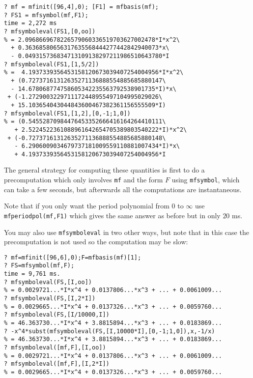 \documentclass[11pt]{article}
\def\kbd#1{{\tt #1}}
\begin{document}
\begin{verbatim}
? mf = mfinit([96,4],0); [F1] = mfbasis(mf);
? FS1 = mfsymbol(mf,F1);
time = 2,272 ms
? mfsymboleval(FS1,[0,oo])
% = 2.0968669678226579060336519703627002478*I*x^2\
  + 0.36368580656317635568444277442842940073*x\
  - 0.049315736834713109138297211986510643780*I
? mfsymboleval(FS1,[1,5/2])
% =  4.1937339356453158120673039407254004956*I*x^2\
  + (0.72737161312635271136888554885685880147\
  - 14.678068774758605342235563792538901735*I)*x\
 + (-1.2729003229711172448955497104995029026\
  + 15.103654043044843600467382361156555509*I)
? mfsymboleval(FS1,[1,2],[0,-1;1,0])
% = (0.54552870984476453352666416164264410111\
   + 2.5224522361088961642654705389803540222*I)*x^2\
 + (-0.72737161312635271136888554885685880148\
   - 6.2906009034679737181009559110881007434*I)*x\
   + 4.1937339356453158120673039407254004956*I
\end{verbatim}

The general strategy for computing these quantities is first to do a
precomputation which only involves \kbd{mf} and the form $F$ using
\kbd{mfsymbol}, which can take a few seconds, but afterwards all the
computations are instantaneous.

Note that if you only want the period polynomial from $0$ to $\infty$ use
\kbd{mfperiodpol(mf,F1)} which gives the same answer as before but in only
$20$ ms.

You may also use \kbd{mfsymboleval} in two other ways, but note that in
this case the precomputation is not used so the computation may be slow:

\begin{verbatim}
? mf=mfinit([96,6],0);F=mfbasis(mf)[1];
? FS=mfsymbol(mf,F);
time = 9,761 ms.
? mfsymboleval(FS,[I,oo])
% = 0.0029721...*I*x^4 + 0.0137806...*x^3 + ... + 0.0061009...
? mfsymboleval(FS,[I,2*I])
% = 0.0029665...*I*x^4 + 0.0137326...*x^3 + ... + 0.0059760...
? mfsymboleval(FS,[I/10000,I])
% = 46.363730...*I*x^4 + 3.8815894...*x^3 + ... + 0.0183869...
? -x^4*subst(mfsymboleval(FS,[I,10000*I],[0,-1;1,0]),x,-1/x)
% = 46.363730...*I*x^4 + 3.8815894...*x^3 + ... + 0.0183869...
? mfsymboleval([mf,F],[I,oo])
% = 0.0029721...*I*x^4 + 0.0137806...*x^3 + ... + 0.0061009...
? mfsymboleval([mf,F],[I,2*I])
% = 0.0029665...*I*x^4 + 0.0137326...*x^3 + ... + 0.0059760...
\end{verbatim}
\end{document}
